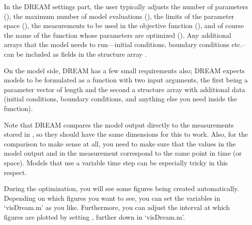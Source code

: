 
In the DREAM settings part, the user typically adjusts the number of parameters
(), the maximum number of model evaluations
(), the limits of the parameter space (),
the measurements to be used in the objective function (), and
of course the name of the function whose parameters are optimized
(). Any additional arrays that the model needs to run---initial
conditions, boundary conditions etc.--can be included as fields in the structure
array . 


On the model side, DREAM has a few small requirements also; DREAM expects models
to be formulated as a function with two input arguments, the first being a
parameter vector of length  and the second a structure array
with additional data (initial conditions, boundary conditions, and anything else
you need inside the function).


Note that DREAM compares the model output directly to the measurements stored in
, so they should have the same dimensions for this
to work. Also, for the comparison to make sense at all, you need to make sure
that the values in the model output and in the measurement correspond to the
same point in time (or space). Models that use a variable time step can be
especially tricky in this respect.


During the optimization, you will see some figures being created automatically.
Depending on which figures you want to see, you can set the 
variables in `visDream.m' as you like. Furthermore, you can adjust the interval
at which figures are plotted by setting , further down in
`visDream.m'.



